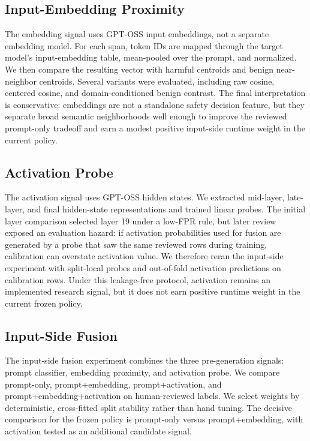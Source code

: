 \documentclass[11pt]{article}
\begin{document}
\subsection{Input-Embedding Proximity}

The embedding signal uses GPT-OSS input embeddings, not a separate embedding model. For each span,
token IDs are mapped through the target model's input-embedding table, mean-pooled over the prompt,
and normalized. We then compare the resulting vector with harmful centroids and benign
near-neighbor centroids. Several variants were evaluated, including raw cosine, centered cosine,
and domain-conditioned benign contrast. The final interpretation is conservative: embeddings are
not a standalone safety decision feature, but they separate broad semantic neighborhoods well enough
to improve the reviewed prompt-only tradeoff and earn a modest positive input-side runtime weight in
the current policy.

\subsection{Activation Probe}

The activation signal uses GPT-OSS hidden states. We extracted mid-layer, late-layer, and final
hidden-state representations and trained linear probes. The initial layer comparison selected layer
19 under a low-FPR rule, but later review exposed an evaluation hazard: if activation probabilities
used for fusion are generated by a probe that saw the same reviewed rows during training, calibration
can overstate activation value. We therefore reran the input-side experiment with split-local probes
and out-of-fold activation predictions on calibration rows. Under this leakage-free protocol,
activation remains an implemented research signal, but it does not earn positive runtime weight in
the current frozen policy.

\subsection{Input-Side Fusion}

The input-side fusion experiment combines the three pre-generation signals: prompt classifier,
embedding proximity, and activation probe. We compare prompt-only, prompt+embedding,
prompt+activation, and prompt+embedding+activation on human-reviewed labels. We select weights by
deterministic, cross-fitted split stability rather than hand tuning. The decisive comparison for the
frozen policy is prompt-only versus prompt+embedding, with activation tested as an additional
candidate signal.
\end{document}
